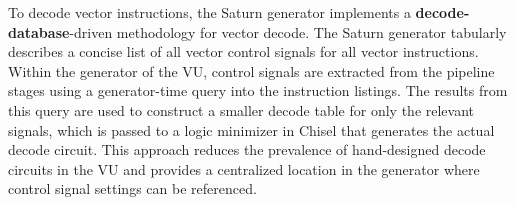 To decode vector instructions, the Saturn generator implements a \textbf{decode-database}-driven methodology for vector decode.
The Saturn generator tabularly describes a concise list of all vector control signals for all vector instructions.
Within the generator of the VU, control signals are extracted from the pipeline stages using a generator-time query into the instruction listings.
The results from this query are used to construct a smaller decode table for only the relevant signals, which is passed to a logic minimizer in Chisel that generates the actual decode circuit.
This approach reduces the prevalence of hand-designed decode circuits in the VU and provides a centralized location in the generator where control signal settings can be referenced.
